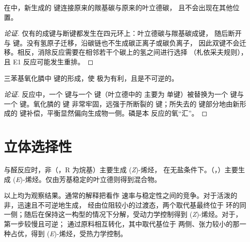 \begin{proposition}[双键恰好在位]\label{prop:b2:wittig:regiospecific}
在中，新生成的  键连接原来的羰基碳与原来的叶立德碳，
且不会出现在其他位置。
\end{proposition}

\begin{proof}[论证]
仅有的成键与断键都发生在四元环上：叶立德碳与羰基碳成键，
随后断开  与  键。没有氢原子迁移，沿碳链也不生成碳正离子或碳负离子，
因此双键不会迁移。相反，消除反应需要在相邻若干个碳上的氢之间进行选择
（札依采夫规则），且 E1 反应可能发生重排。
\end{proof}

\begin{proposition}[推动力]\label{prop:b2:wittig:driving}
三苯基氧化膦中  键的形成，使
极为有利，且是不可逆的。
\end{proposition}

\begin{proof}[论证]
反应中，一个  键与一个  键（叶立德中的  主要为
 单键）被替换为一个  键与一个  键。氧化膦的  键
非常牢固，远强于所断裂的  键；所失去的  键部分地由新形成的
 键补偿，平衡显然偏向生成物一侧。磷是本
反应的氧“汇”。
\end{proof}

\section{立体选择性}

\begin{proposition}[烯烃的几何构型]\label{prop:b2:wittig:stereo}
与醛反应时，非（，R 为烷基）主要生成 (\textit{Z})-烯烃，
在无盐条件下。（，）主要生成
(\textit{E})-烯烃。仅由芳基稳定的叶立德则得到混合物。
\end{proposition}

\admitted

以上均为观察结果。通常的解释把看作
速率与稳定性之间的竞争。对于活泼的非，迅速且不可逆地生成，
经由位阻较小的过渡态，两个取代基最终位于
环的同一侧；随后在保持这一构型的情况下分解，受动力学控制得到
(\textit{Z})-烯烃。对于，第一步较慢且可逆；
通过原料相互转化，其中取代基位于
两侧、张力较小的那一种占优，得到 (\textit{E})-烯烃，受热力学控制。

